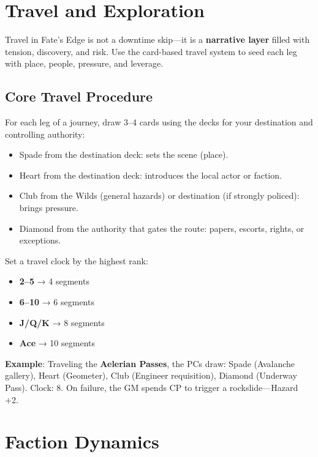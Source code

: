 \section*{Travel and Exploration}

Travel in Fate's Edge is not a downtime skip---it is a \textbf{narrative layer} filled with tension, discovery, and risk. Use the card-based travel system to seed each leg with place, people, pressure, and leverage.

\subsection*{Core Travel Procedure}

For each leg of a journey, draw 3--4 cards using the decks for your destination and controlling authority:

\begin{itemize}
    \item Spade from the destination deck: sets the scene (place).
    \item Heart from the destination deck: introduces the local actor or faction.
    \item Club from the Wilds (general hazards) or destination (if strongly policed): brings pressure.
    \item Diamond from the authority that gates the route: papers, escorts, rights, or exceptions.
\end{itemize}

Set a travel clock by the highest rank:
\begin{itemize}
    \item \textbf{2--5} → 4 segments
    \item \textbf{6--10} → 6 segments
    \item \textbf{J/Q/K} → 8 segments
    \item \textbf{Ace} → 10 segments
\end{itemize}

\textbf{Example}: Traveling the \textbf{Aelerian Passes}, the PCs draw: Spade (Avalanche gallery), Heart (Geometer), Club (Engineer requisition), Diamond (Underway Pass). Clock: 8. On failure, the GM spends CP to trigger a rockslide---Hazard +2.

\section*{Faction Dynamics}

